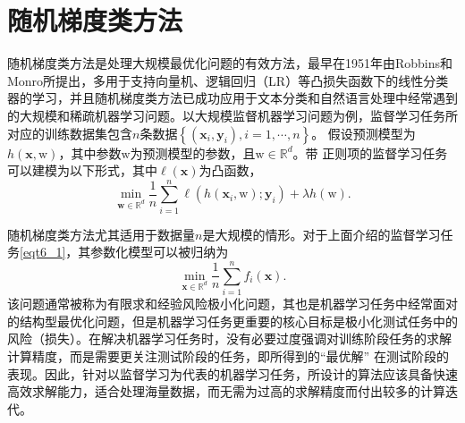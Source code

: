 \section{随机梯度类方法}
随机梯度类方法是处理大规模最优化问题的有效方法，最早在1951年由Robbins和Monro所提出\cite{SGD}，多用于支持向量机、逻辑回归（LR）等凸损失函数下的线性分类器的学习，并且随机梯度类方法已成功应用于文本分类和自然语言处理中经常遇到的大规模和稀疏机器学习问题。以大规模监督机器学习问题为例，监督学习任务所对应的训练数据集包含$n$条数据$\left\{\left(\bm{x}_{i}, \bm{y}_{i}\right), i=1, \cdots, n\right\}$。 假设预测模型为$h(\bm{x}, \mathrm{w})$，其中参数$\mathrm{w}$为预测模型的参数，且$\mathrm{w} \in \mathbb{R}^{d}$。带 正则项的监督学习任务可以建模为以下形式，其中$\ell(\bm{x})$为凸函数，
\begin{equation}
    \min _{\mathbf{w} \in \mathbb{R}^{d}} \frac{1}{n} \sum_{i=1}^{n} \ell\left(h\left(\bm{x}_{i}, \mathrm{w}\right) ; \bm{y}_{i}\right)+\lambda h(\mathrm{w}) .
    \label{eqt6_1}
\end{equation}

\par 随机梯度类方法尤其适用于数据量$n$是大规模的情形。对于上面介绍的监督学习任务\ref{eqt6_1}，其参数化模型可以被归纳为
\begin{equation}
    \min _{\bm{x} \in \mathbb{R}^{d}} \frac{1}{n} \sum_{i=1}^{n} f_{i}(\bm{x}) .
    \label{eqt6_2}
\end{equation}
该问题通常被称为有限求和经验风险极小化问题，其也是机器学习任务中经常面对的结构型最优化问题，但是机器学习任务更重要的核心目标是极小化测试任务中的风险（损失）。在解决机器学习任务时，没有必要过度强调对训练阶段任务的求解计算精度，而是需要更关注测试阶段的任务，即所得到的“最优解” 在测试阶段的表现。因此，针对以监督学习为代表的机器学习任务，所设计的算法应该具备快速高效求解能力，适合处理海量数据，而无需为过高的求解精度而付出较多的计算迭代。

